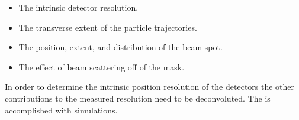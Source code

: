 \begin{itemize}
  \setlength{\itemsep}{0pt}
\setlength{\parskip}{0pt}
\setlength{\parsep}{0pt}
  \item The intrinsic detector resolution.
  \item The transverse extent of the particle trajectories.
  \item The position, extent, and distribution of the beam spot.
  \item The effect of beam scattering off of the mask.
\end{itemize}
In order to determine the intrinsic position resolution of the detectors the other contributions to the measured resolution need to be deconvoluted.  The is accomplished with simulations.


